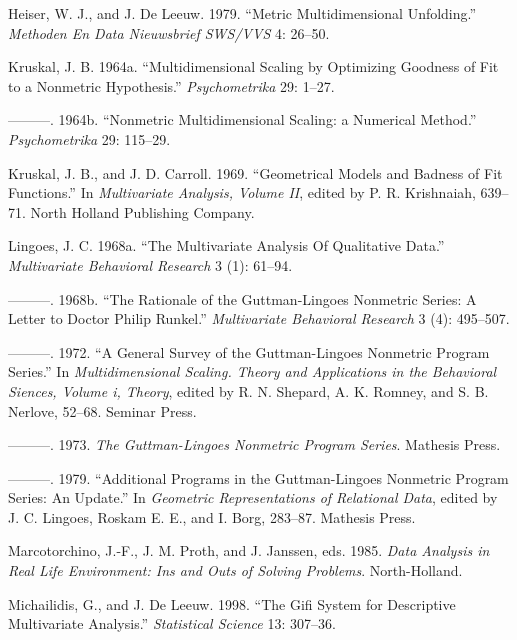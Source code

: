 \documentclass[
  12pt,
]{article}
\newlength{\cslhangindent}
\newenvironment{CSLReferences}[2] %
 {\begin{list}{}{%
  \setlength{\itemindent}{0pt}
  \setlength{\leftmargin}{0pt}
  \setlength{\parsep}{0pt}
  \ifodd #1
   \setlength{\leftmargin}{\cslhangindent}
   \setlength{\itemindent}{-1\cslhangindent}
  \fi
  \setlength{\itemsep}{#2\baselineskip}}}
 {\end{list}}
\begin{document}
\begin{CSLReferences}{1}{0}
Heiser, W. J., and J. De Leeuw. 1979. {``Metric Multidimensional Unfolding.''} \emph{Methoden En Data Nieuwsbrief SWS/VVS} 4: 26--50.

Kruskal, J. B. 1964a. {``{Multidimensional Scaling by Optimizing Goodness of Fit to a Nonmetric Hypothesis}.''} \emph{Psychometrika} 29: 1--27.

---------. 1964b. {``{Nonmetric Multidimensional Scaling: a Numerical Method}.''} \emph{Psychometrika} 29: 115--29.

Kruskal, J. B., and J. D. Carroll. 1969. {``{Geometrical Models and Badness of Fit Functions}.''} In \emph{Multivariate Analysis, Volume II}, edited by P. R. Krishnaiah, 639--71. North Holland Publishing Company.

Lingoes, J. C. 1968a. {``{The Multivariate Analysis Of Qualitative Data}.''} \emph{Multivariate Behavioral Research} 3 (1): 61--94.

---------. 1968b. {``{The Rationale of the Guttman-Lingoes Nonmetric Series: A Letter to Doctor Philip Runkel}.''} \emph{Multivariate Behavioral Research} 3 (4): 495--507.

---------. 1972. {``A General Survey of the Guttman-Lingoes Nonmetric Program Series.''} In \emph{Multidimensional Scaling. Theory and Applications in the Behavioral Siences, Volume i, Theory}, edited by R. N. Shepard, A. K. Romney, and S. B. Nerlove, 52--68. Seminar Press.

---------. 1973. \emph{{The Guttman-Lingoes Nonmetric Program Series}}. Mathesis Press.

---------. 1979. {``Additional Programs in the Guttman-Lingoes Nonmetric Program Series: An Update.''} In \emph{{Geometric Representations of Relational Data}}, edited by J. C. Lingoes, Roskam E. E., and I. Borg, 283--87. Mathesis Press.

Marcotorchino, J.-F., J. M. Proth, and J. Janssen, eds. 1985. \emph{Data Analysis in Real Life Environment: Ins and Outs of Solving Problems}. North-Holland.

Michailidis, G., and J. De Leeuw. 1998. {``The Gifi System for Descriptive Multivariate Analysis.''} \emph{Statistical Science} 13: 307--36.


\end{CSLReferences}
\end{document}
